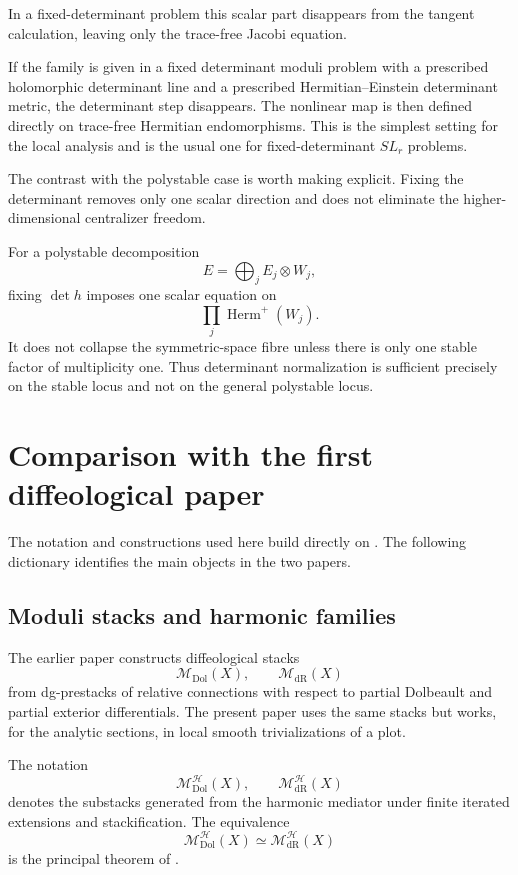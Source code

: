 \documentclass[11pt,reqno]{amsart}
\theoremstyle{definition}
\theoremstyle{remark}
\newcommand{\cH}{\mathcal H}
\newcommand{\Dol}{\mathrm{Dol}}
\newcommand{\dR}{\mathrm{dR}}
\newcommand{\MdiffDol}{\mathscr M_{\Dol}}
\newcommand{\MdiffdR}{\mathscr M_{\dR}}
\newcommand{\MHDol}{\mathscr M^{\cH}_{\Dol}}
\newcommand{\MHdR}{\mathscr M^{\cH}_{\dR}}
\begin{document}
In a fixed-determinant problem this scalar part disappears from the tangent calculation, leaving only the trace-free Jacobi equation.


If the family is given in a fixed determinant moduli problem with a prescribed holomorphic determinant line and a prescribed Hermitian--Einstein determinant metric, the determinant step disappears.  The nonlinear map is then defined directly on trace-free Hermitian endomorphisms.  This is the simplest setting for the local analysis and is the usual one for fixed-determinant $SL_r$ problems.

The contrast with the polystable case is worth making explicit.  Fixing the determinant removes only one scalar direction and does not eliminate the higher-dimensional centralizer freedom.

For a polystable decomposition
\[
  E=\bigoplus_jE_j\otimes W_j,
\]
fixing $\det h$ imposes one scalar equation on
\[
  \prod_j\operatorname{Herm}^+(W_j).
\]
It does not collapse the symmetric-space fibre unless there is only one stable factor of multiplicity one.  Thus determinant normalization is sufficient precisely on the stable locus and not on the general polystable locus.

\section{Comparison with the first diffeological paper}\label{app:dictionary}

The notation and constructions used here build directly on \cite{AzamRayan2026}.  The following dictionary identifies the main objects in the two papers.

\subsection{Moduli stacks and harmonic families}

The earlier paper constructs diffeological stacks
\[
  \MdiffDol(X),\qquad\MdiffdR(X)
\]
from dg-prestacks of relative connections with respect to partial Dolbeault and partial exterior differentials.  The present paper uses the same stacks but works, for the analytic sections, in local smooth trivializations of a plot.

The notation
\[
  \MHDol(X),\qquad\MHdR(X)
\]
denotes the substacks generated from the harmonic mediator under finite iterated extensions and stackification.  The equivalence
\[
  \MHDol(X)\simeq\MHdR(X)
\]
is the principal theorem of \cite{AzamRayan2026}.
\end{document}
